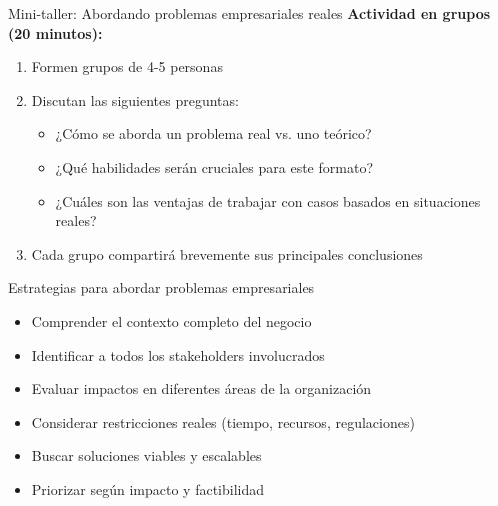 \documentclass[10pt]{beamer}
\begin{document}
\begin{frame}{Mini-taller: Abordando problemas empresariales reales}
    \textbf{Actividad en grupos (20 minutos):}
    \begin{enumerate}
        \item Formen grupos de 4-5 personas
        \item Discutan las siguientes preguntas:
        \begin{itemize}
            \item ¿Cómo se aborda un problema real vs. uno teórico?
            \item ¿Qué habilidades serán cruciales para este formato?
            \item ¿Cuáles son las ventajas de trabajar con casos basados en situaciones reales?
        \end{itemize}
        \item Cada grupo compartirá brevemente sus principales conclusiones
    \end{enumerate}
\end{frame}

\begin{frame}{Estrategias para abordar problemas empresariales}
    \begin{itemize}
        \item Comprender el contexto completo del negocio
        \item Identificar a todos los stakeholders involucrados
        \item Evaluar impactos en diferentes áreas de la organización
        \item Considerar restricciones reales (tiempo, recursos, regulaciones)
        \item Buscar soluciones viables y escalables
        \item Priorizar según impacto y factibilidad
    \end{itemize}
\end{frame}
\end{document}
